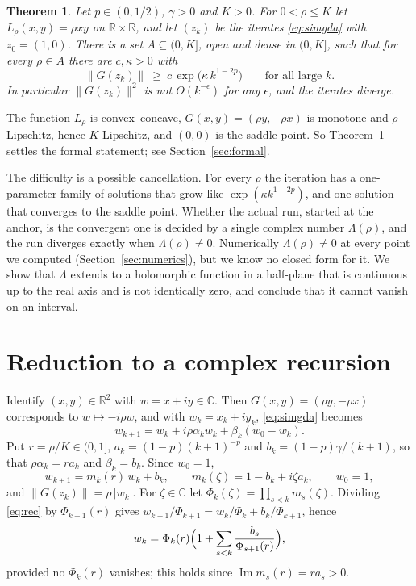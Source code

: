 \documentclass[11pt]{amsart}
\newtheorem{theorem}{Theorem}
\theoremstyle{remark}
\newcommand{\R}{\mathbb{R}}
\newcommand{\C}{\mathbb{C}}
\newcommand{\im}{\operatorname{Im}}
\begin{document}
\begin{theorem}\label{thm:main}
Let $p\in(0,1/2)$, $\gamma>0$ and $K>0$.
For $0<\rho\le K$ let $L_\rho(x,y)=\rho xy$ on $\R\times\R$, and let $(z_k)$ be the iterates \eqref{eq:simgda} with $z_0=(1,0)$.
There is a set $A\subseteq(0,K]$, open and dense in $(0,K]$, such that for every $\rho\in A$ there are $c,\kappa>0$ with
\[
\|G(z_k)\|\ \ge\ c\,\exp\!\bigl(\kappa\,k^{1-2p}\bigr)\qquad\text{for all large }k .
\]
In particular $\|G(z_k)\|^2$ is not $O(k^{-\epsilon})$ for any $\epsilon$, and the iterates diverge.
\end{theorem}

The function $L_\rho$ is convex--concave, $G(x,y)=(\rho y,-\rho x)$ is monotone and $\rho$-Lipschitz, hence $K$-Lipschitz, and $(0,0)$ is the saddle point.
So Theorem~\ref{thm:main} settles the formal statement; see Section~\ref{sec:formal}.

The difficulty is a possible cancellation.
For every $\rho$ the iteration has a one-parameter family of solutions that grow like $\exp(\kappa k^{1-2p})$, and one solution that converges to the saddle point.
Whether the actual run, started at the anchor, is the convergent one is decided by a single complex number $\Lambda(\rho)$, and the run diverges exactly when $\Lambda(\rho)\neq0$.
Numerically $\Lambda(\rho)\neq0$ at every point we computed (Section~\ref{sec:numerics}), but we know no closed form for it.
We show that $\Lambda$ extends to a holomorphic function in a half-plane that is continuous up to the real axis and is not identically zero, and conclude that it cannot vanish on an interval.

\section{Reduction to a complex recursion}

Identify $(x,y)\in\R^2$ with $w=x+iy\in\C$.
Then $G(x,y)=(\rho y,-\rho x)$ corresponds to $w\mapsto-i\rho w$, and with $w_k=x_k+iy_k$, \eqref{eq:simgda} becomes
\[
w_{k+1}=w_k+i\rho\alpha_kw_k+\beta_k(w_0-w_k).
\]
Put $r=\rho/K\in(0,1]$, $a_k=(1-p)(k+1)^{-p}$ and $b_k=(1-p)\gamma/(k+1)$, so that $\rho\alpha_k=ra_k$ and $\beta_k=b_k$.
Since $w_0=1$,
\begin{equation}\label{eq:rec}
w_{k+1}=m_k(r)\,w_k+b_k,\qquad m_k(\zeta)=1-b_k+i\zeta a_k,\qquad w_0=1,
\end{equation}
and $\|G(z_k)\|=\rho\,|w_k|$.
For $\zeta\in\C$ let $\Phi_k(\zeta)=\prod_{s<k}m_s(\zeta)$.
Dividing \eqref{eq:rec} by $\Phi_{k+1}(r)$ gives $w_{k+1}/\Phi_{k+1}=w_k/\Phi_k+b_k/\Phi_{k+1}$, hence
\begin{equation}\label{eq:closed}
w_k=\Phi_k(r)\Bigl(1+\sum_{s<k}\frac{b_s}{\Phi_{s+1}(r)}\Bigr),
\end{equation}
provided no $\Phi_k(r)$ vanishes; this holds since $\im m_s(r)=ra_s>0$.
\end{document}
